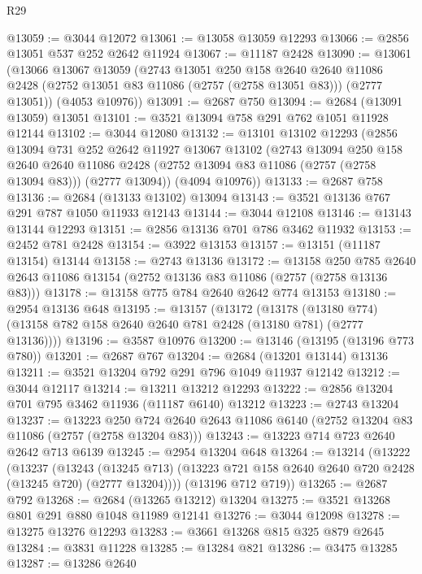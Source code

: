 \begin{lexlean}{R29}
\begin{coremodule}
@13059 := @3044 @12072
@13061 := @13058 @13059 @12293
@13066 := @2856 @13051 @537 @252 @2642 @11924
@13067 := @11187 @2428
@13090 := @13061
    (@13066
      @13067
      @13059
      (@2743
        @13051
        @250
        @158
        @2640
        @2640
        @11086
        @2428
        (@2752 @13051 @83 @11086 (@2757 (@2758 @13051 @83)))
        (@2777 @13051))
      (@4053 @10976))
@13091 := @2687 @750
@13094 := @2684 (@13091 @13059) @13051
@13101 := @3521 @13094 @758 @291 @762 @1051 @11928 @12144
@13102 := @3044 @12080
@13132 := @13101
    @13102
    @12293
    (@2856
      @13094
      @731
      @252
      @2642
      @11927
      @13067
      @13102
      (@2743
        @13094
        @250
        @158
        @2640
        @2640
        @11086
        @2428
        (@2752 @13094 @83 @11086 (@2757 (@2758 @13094 @83)))
        (@2777 @13094))
      (@4094 @10976))
@13133 := @2687 @758
@13136 := @2684 (@13133 @13102) @13094
@13143 := @3521 @13136 @767 @291 @787 @1050 @11933 @12143
@13144 := @3044 @12108
@13146 := @13143 @13144 @12293
@13151 := @2856 @13136 @701 @786 @3462 @11932
@13153 := @2452 @781 @2428
@13154 := @3922 @13153
@13157 := @13151 (@11187 @13154) @13144
@13158 := @2743 @13136
@13172 := @13158
    @250
    @785
    @2640
    @2643
    @11086
    @13154
    (@2752 @13136 @83 @11086 (@2757 (@2758 @13136 @83)))
@13178 := @13158 @775 @784 @2640 @2642 @774 @13153
@13180 := @2954 @13136 @648
@13195 := @13157
    (@13172
      (@13178 (@13180 @774) (@13158 @782 @158 @2640 @2640 @781 @2428 (@13180 @781) (@2777 @13136))))
@13196 := @3587 @10976
@13200 := @13146 (@13195 (@13196 @773 @780))
@13201 := @2687 @767
@13204 := @2684 (@13201 @13144) @13136
@13211 := @3521 @13204 @792 @291 @796 @1049 @11937 @12142
@13212 := @3044 @12117
@13214 := @13211 @13212 @12293
@13222 := @2856 @13204 @701 @795 @3462 @11936 (@11187 @6140) @13212
@13223 := @2743 @13204
@13237 := @13223
    @250
    @724
    @2640
    @2643
    @11086
    @6140
    (@2752 @13204 @83 @11086 (@2757 (@2758 @13204 @83)))
@13243 := @13223 @714 @723 @2640 @2642 @713 @6139
@13245 := @2954 @13204 @648
@13264 := @13214
    (@13222
      (@13237
        (@13243
          (@13245 @713)
          (@13223 @721 @158 @2640 @2640 @720 @2428 (@13245 @720) (@2777 @13204))))
      (@13196 @712 @719))
@13265 := @2687 @792
@13268 := @2684 (@13265 @13212) @13204
@13275 := @3521 @13268 @801 @291 @880 @1048 @11989 @12141
@13276 := @3044 @12098
@13278 := @13275 @13276 @12293
@13283 := @3661 @13268 @815 @325 @879 @2645
@13284 := @3831 @11228
@13285 := @13284 @821
@13286 := @3475 @13285
@13287 := @13286 @2640

\end{coremodule}
\end{lexlean}
